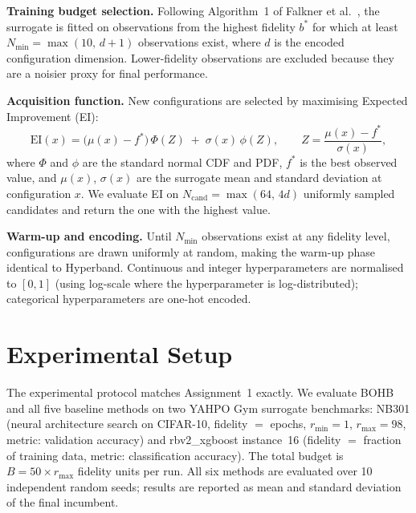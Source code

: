 \documentclass[review]{AIM_report}
\begin{document}
\textbf{Training budget selection.}
Following Algorithm~1 of Falkner et al.~\cite{falkner2018bohb}, the surrogate is fitted on observations from the highest fidelity $b^*$ for which at least $N_{\min}{=}\max(10,\,d{+}1)$ observations exist, where $d$ is the encoded configuration dimension. Lower-fidelity observations are excluded because they are a noisier proxy for final performance.

\textbf{Acquisition function.}
New configurations are selected by maximising Expected Improvement (EI):
\begin{equation}
    \mathrm{EI}(x) = \bigl(\mu(x) - f^*\bigr)\,\Phi(Z)\;+\;\sigma(x)\,\phi(Z),
    \qquad Z = \frac{\mu(x) - f^*}{\sigma(x)},
    \label{eq:ei}
\end{equation}
where $\Phi$ and $\phi$ are the standard normal CDF and PDF, $f^*$ is the best observed value, and $\mu(x)$, $\sigma(x)$ are the surrogate mean and standard deviation at configuration $x$. We evaluate EI on $N_{\mathrm{cand}}{=}\max(64,\,4d)$ uniformly sampled candidates and return the one with the highest value.

\textbf{Warm-up and encoding.}
Until $N_{\min}$ observations exist at any fidelity level, configurations are drawn uniformly at random, making the warm-up phase identical to Hyperband. Continuous and integer hyperparameters are normalised to $[0,1]$ (using log-scale where the hyperparameter is log-distributed); categorical hyperparameters are one-hot encoded.

\section{Experimental Setup}

The experimental protocol matches Assignment~1 exactly. We evaluate BOHB and all five baseline methods on two YAHPO Gym surrogate benchmarks: NB301 (neural architecture search on CIFAR-10, fidelity $=$ epochs, $r_{\min}{=}1$, $r_{\max}{=}98$, metric: validation accuracy) and rbv2\_xgboost instance~16 (fidelity $=$ fraction of training data, metric: classification accuracy). The total budget is $B{=}50{\times}r_{\max}$ fidelity units per run. All six methods are evaluated over 10 independent random seeds; results are reported as mean and standard deviation of the final incumbent.

\end{document}
